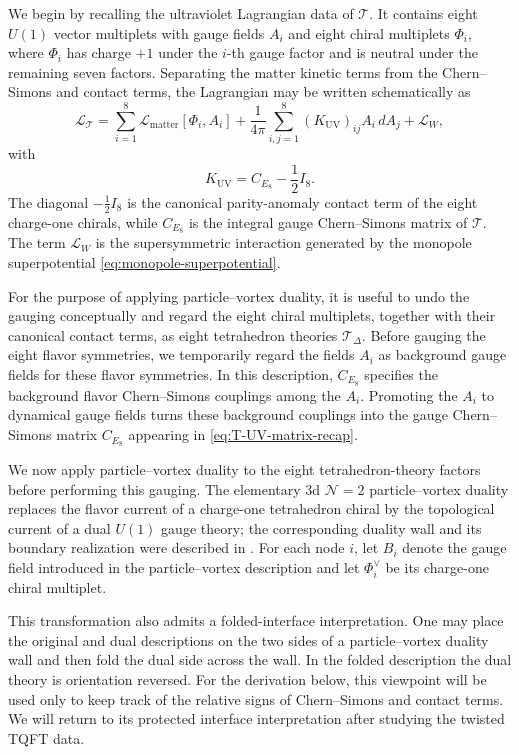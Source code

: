 \documentclass[11pt,a4paper]{article}
\numberwithin{equation}{section}
\begin{document}
We begin by recalling the ultraviolet Lagrangian data of $\mathcal T$.  It contains eight $U(1)$ vector multiplets with gauge fields $A_i$ and eight chiral multiplets $\Phi_i$, where $\Phi_i$ has charge $+1$ under the $i$-th gauge factor and is neutral under the remaining seven factors.  Separating the matter kinetic terms from the Chern--Simons and contact terms, the Lagrangian may be written schematically as
\begin{equation}
  \mathcal L_{\mathcal T}
  =
  \sum_{i=1}^{8}\mathcal L_{\mathrm{matter}}[\Phi_i,A_i]
  +\frac{1}{4\pi}
  \sum_{i,j=1}^{8}
  (K_{\mathrm{UV}})_{ij} A_i\,dA_j
  +\mathcal L_W,
  \label{eq:T-Lagrangian}
\end{equation}
with
\begin{equation}
  K_{\mathrm{UV}}
  =C_{E_8}-\frac12 I_8.
  \label{eq:T-UV-matrix-recap}
\end{equation}
The diagonal $-\frac12 I_8$ is the canonical parity-anomaly contact term of the eight charge-one chirals, while $C_{E_8}$ is the integral gauge Chern--Simons matrix of $\mathcal T$.  The term $\mathcal L_W$ is the supersymmetric interaction generated by the monopole superpotential \eqref{eq:monopole-superpotential}.

For the purpose of applying particle--vortex duality, it is useful to undo the gauging conceptually and regard the eight chiral multiplets, together with their canonical contact terms, as eight tetrahedron theories $\mathcal T_\Delta$.  Before gauging the eight flavor symmetries, we temporarily regard the fields $A_i$ as background gauge fields for these flavor symmetries.  In this description, $C_{E_8}$ specifies the background flavor Chern--Simons couplings among the $A_i$.  Promoting the $A_i$ to dynamical gauge fields turns these background couplings into the gauge Chern--Simons matrix $C_{E_8}$ appearing in \eqref{eq:T-UV-matrix-recap}.

We now apply particle--vortex duality to the eight tetrahedron-theory factors before performing this gauging.  The elementary 3d $\mathcal N=2$ particle--vortex duality \cite{Dimofte:2011py} replaces the flavor current of a charge-one tetrahedron chiral by the topological current of a dual $U(1)$ gauge theory; the corresponding duality wall and its boundary realization were described in \cite{Dimofte:2017tpi}.  For each node $i$, let $B_i$ denote the gauge field introduced in the particle--vortex description and let $\Phi_i^\vee$ be its charge-one chiral multiplet.

This transformation also admits a folded-interface interpretation.  One may place the original and dual descriptions on the two sides of a particle--vortex duality wall and then fold the dual side across the wall.  In the folded description the dual theory is orientation reversed.  For the derivation below, this viewpoint will be used only to keep track of the relative signs of Chern--Simons and contact terms.  We will return to its protected interface interpretation after studying the twisted TQFT data.
\end{document}

